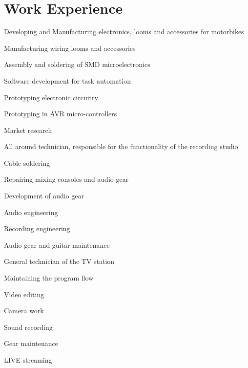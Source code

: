 \section*{Work Experience}

	{
		\begin{center}
			Developing and Manufacturing electronics, looms and accessories for motorbikes
		\end{center}
	}
	{
		\item Manufacturing wiring looms and accessories
		\item Assembly and soldering of SMD microelectronics
		\item Software development for task automation
		\item Prototyping electronic circuitry 
		\item Prototyping in AVR micro-controllers 
		\item Market research
	}

	{
		\begin{center}
			All around technician, responsible for the functionality of the recording studio 
		\end{center}
	}
	{
    	\item Cable soldering
    	\item Repairing mixing consoles and audio gear
    	\item Development of audio gear
    	\item Audio engineering
    	\item Recording engineering
    	\item Audio gear and guitar maintenance
	}

	{
		\begin{center}
			General technician of the TV station
		\end{center}
	}
	{
		\item Maintaining the program flow
		\item Video editing
		\item Camera work
		\item Sound recording 
		\item Gear maintenance
		\item LIVE streaming
	}

